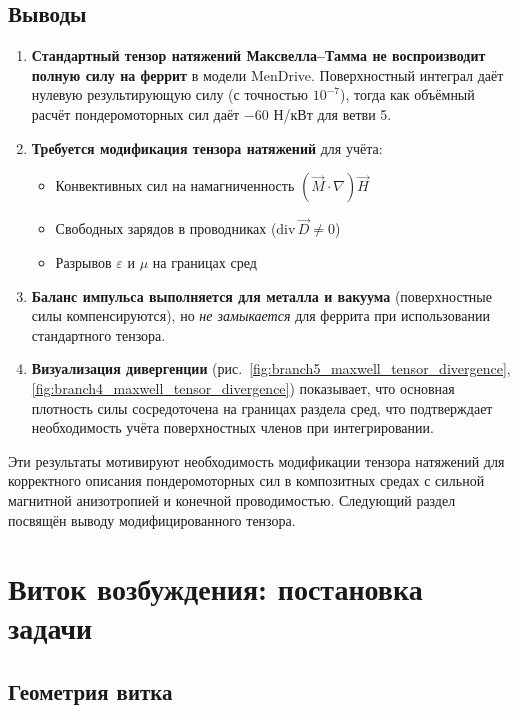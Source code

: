 \documentclass[a4paper,12pt]{article}
\begin{document}
\subsection{Выводы}

\begin{enumerate}
    \item \textbf{Стандартный тензор натяжений Максвелла--Тамма не воспроизводит
    полную силу на феррит} в модели MenDrive. Поверхностный интеграл даёт
    нулевую результирующую силу (с точностью $10^{-7}$), тогда как объёмный
    расчёт пондеромоторных сил даёт $-60$ Н/кВт для ветви 5.



    \item \textbf{Требуется модификация тензора натяжений} для учёта:
    \begin{itemize}
        \item Конвективных сил на намагниченность $(\vec{M}\cdot\nabla)\vec{H}$
        \item Свободных зарядов в проводниках ($\text{div}\,\vec{D} \neq 0$)
        \item Разрывов $\varepsilon$ и $\mu$ на границах сред
    \end{itemize}

    \item \textbf{Баланс импульса выполняется для металла и вакуума}
    (поверхностные силы компенсируются), но \textit{не замыкается} для феррита
    при использовании стандартного тензора.

    \item \textbf{Визуализация дивергенции} (рис.~\ref{fig:branch5_maxwell_tensor_divergence},
    \ref{fig:branch4_maxwell_tensor_divergence}) показывает, что основная плотность силы
    сосредоточена на границах раздела сред, что подтверждает необходимость
    учёта поверхностных членов при интегрировании.
\end{enumerate}

Эти результаты мотивируют необходимость модификации тензора натяжений для
корректного описания пондеромоторных сил в композитных средах с сильной
магнитной анизотропией и конечной проводимостью. Следующий раздел посвящён
выводу модифицированного тензора.


\section{Виток возбуждения: постановка задачи}

\subsection{Геометрия витка}
\end{document}
